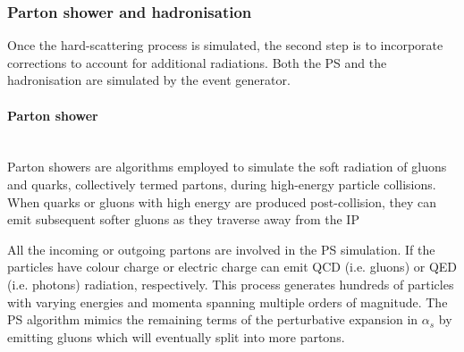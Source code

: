 		
		
\subsubsection{Parton shower and hadronisation}
\label{sec:Chap3.1:MC:Steps:PS}

Once the hard-scattering process is simulated, the second step is to
incorporate corrections to account for additional radiations. 
Both the PS and the hadronisation are simulated by the event generator.  

\paragraph{Parton shower}\mbox{}\\
Parton showers are algorithms employed to simulate the soft radiation of 
gluons and quarks, collectively termed partons, during high-energy particle 
collisions. When quarks or gluons with high energy are produced post-collision, 
they can emit subsequent softer gluons as they traverse away from the IP


All the incoming or outgoing partons are involved in the PS simulation.
If the particles have colour charge or electric charge can emit
QCD (i.e. gluons) or QED (i.e. photons) radiation, respectively.
This process generates hundreds of particles with 
varying energies and momenta spanning multiple orders of magnitude.
The PS algorithm mimics the remaining terms of the perturbative expansion 
in $\alpha_{s}$ by emitting gluons which will eventually split into more partons.

